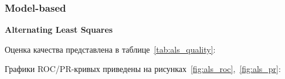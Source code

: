 \pagebreak

\subsubsection{Model-based}
\vspace{1em}
\textbf{Alternating Least Squares}

Оценка качества представлена в таблице~\ref{tab:als_quality}:

\begin{table}[h]
    \caption{Значения метрик для ALS}
    \label{tab:als_quality}
\end{table}

Графики ROC/PR-кривых приведены на рисунках~\ref{fig:als_roc},~\ref{fig:als_pr}:

